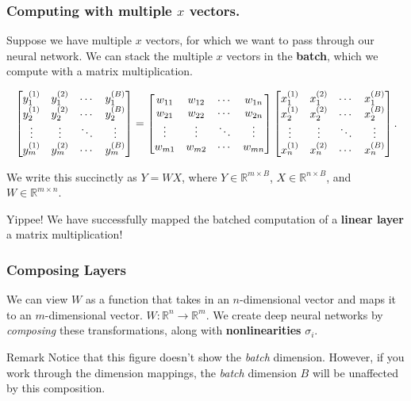 \documentclass{beamer}
\begin{document}
\begin{frame}
  \frametitle{Computing with multiple \(x\) vectors.}
  Suppose we have multiple \(x\) vectors, for which we want to pass through our
  neural network. We can stack the multiple \(x\) vectors in the \textbf{batch},
  which we compute with a matrix multiplication.

  \[
    \resizebox{\textwidth}{!}{$\displaystyle
      \begin{bmatrix}
        y_1^{(1)} & y_1^{(2)} & \cdots & y_1^{(B)} \\
        y_2^{(1)} & y_2^{(2)} & \cdots & y_2^{(B)} \\
        \vdots & \vdots & \ddots & \vdots \\
        y_m^{(1)} & y_m^{(2)} & \cdots & y_m^{(B)}
      \end{bmatrix}
      =
      \begin{bmatrix}
        w_{11} & w_{12} & \cdots & w_{1n} \\
        w_{21} & w_{22} & \cdots & w_{2n} \\
        \vdots & \vdots & \ddots & \vdots \\
        w_{m1} & w_{m2} & \cdots & w_{mn}
      \end{bmatrix}
      \begin{bmatrix}
        x_1^{(1)} & x_1^{(2)} & \cdots & x_1^{(B)} \\
        x_2^{(1)} & x_2^{(2)} & \cdots & x_2^{(B)} \\
        \vdots & \vdots & \ddots & \vdots \\
        x_n^{(1)} & x_n^{(2)} & \cdots & x_n^{(B)}
      \end{bmatrix}.
    $}
  \]

  We write this succinctly as \(Y = WX\), where \(Y \in \mathbb{R}^{m \times B}\),
  \(X \in \mathbb{R}^{n \times B}\), and \(W \in \mathbb{R}^{m \times n}\).

  \begin{alertblock}{Yippee!}
    We have successfully mapped the batched computation of a \textbf{linear layer}
    a matrix multiplication!
  \end{alertblock}
\end{frame}

\begin{frame}
  \frametitle{Composing Layers}

  We can view \(W\) as a function that takes in an \(n\)-dimensional vector and
  maps it to an \(m\)-dimensional vector. \(W \colon \mathbb{R}^n \rightarrow \mathbb{R}^m\).
  We create deep neural networks by \emph{composing} these transformations, along
  with  \textbf{nonlinearities} \(\sigma_i\).

  

  \begin{block}{Remark}
    Notice that this figure doesn't show the \emph{batch} dimension. However,
    if you work through the dimension mappings, the \emph{batch} dimension \(B\)
    will be unaffected by this composition.
  \end{block}
\end{frame}
\end{document}
